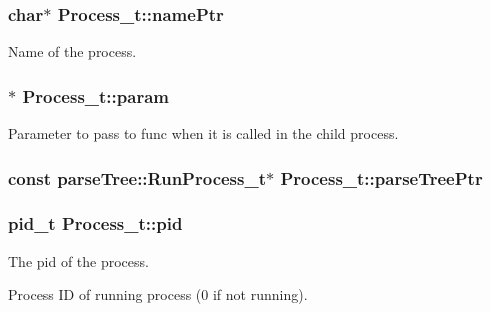 \subsubsection[{\texorpdfstring{name\+Ptr}{namePtr}}]{\setlength{\rightskip}{0pt plus 5cm}char$\ast$ Process\+\_\+t\+::name\+Ptr}\hypertarget{struct_process__t_a152dc3ab40035d6bc5a81ce724c0bd9b}{}\label{struct_process__t_a152dc3ab40035d6bc5a81ce724c0bd9b}


Name of the process. 

\subsubsection[{\texorpdfstring{param}{param}}]{$\ast$ Process\+\_\+t\+::param}\hypertarget{struct_process__t_a8bb1350a9961c9447e1aabf833355cb1}{}\label{struct_process__t_a8bb1350a9961c9447e1aabf833355cb1}


Parameter to pass to func when it is called in the child process. 

\subsubsection[{\texorpdfstring{parse\+Tree\+Ptr}{parseTreePtr}}]{\setlength{\rightskip}{0pt plus 5cm}const {\bf parse\+Tree\+::\+Run\+Process\+\_\+t}$\ast$ Process\+\_\+t\+::parse\+Tree\+Ptr}\hypertarget{struct_process__t_a72c5a323e2e84d88f0b0fb0a54d4cf73}{}\label{struct_process__t_a72c5a323e2e84d88f0b0fb0a54d4cf73}
\subsubsection[{\texorpdfstring{pid}{pid}}]{\setlength{\rightskip}{0pt plus 5cm}pid\+\_\+t Process\+\_\+t\+::pid}\hypertarget{struct_process__t_a6403a307f720bbb03844e1a3cc5d9d1f}{}\label{struct_process__t_a6403a307f720bbb03844e1a3cc5d9d1f}


The pid of the process. 

Process ID of running process (0 if not running). 
